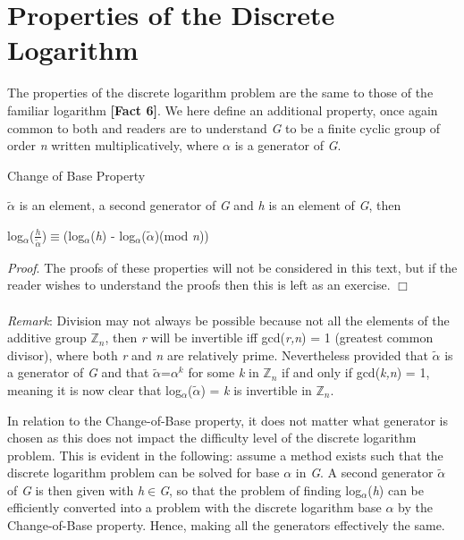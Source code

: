 \documentclass[iwp,first]{luthesis}
\begin{document}
\section{Properties of the Discrete Logarithm}

The properties of the discrete logarithm problem are the same to those of the familiar logarithm \textbf{[Fact 6]}. We here define an additional property, once again common to both and readers are to understand \textit{G} to be a finite cyclic group of order \textit{n} written multiplicatively, where \textit{$\alpha$} is a generator of \textit{G}.

\begin{mydef}
Change of Base Property
\end{mydef}

$\widetilde{\alpha}$ is an element, a second generator of \textit{G} and \textit{h} is an element of \textit{G}, then

\begin{center}
log$_\alpha$(\textit{$\frac{h}{\widetilde{\alpha}}$})$\equiv$(log$_\alpha$(\textit{h}) - log$_\alpha$($\widetilde{\alpha}$)(mod \textit{n}))
\end{center}

\textit{Proof}. The proofs of these properties will not be considered in this text, but if the reader wishes to understand the proofs then this is left as an exercise. $\Box$
\\
\\
\textit{Remark}: Division may not always be possible because not all the elements of the additive group $\mathbb{Z}_n$, then \textit{r} will be invertible iff gcd(\textit{r,n}) = 1 (greatest common divisor), where both \textit{r} and \textit{n} are relatively prime. Nevertheless provided that $\widetilde{\alpha}$ is a generator of \textit{G} and that $\widetilde{\alpha}$=$\alpha$$^k$ for some \textit{k} in $\mathbb{Z}_n$ if and only if gcd(\textit{k,n}) = 1, meaning it is now clear that  log$_\alpha$($\widetilde{\alpha}$) = \textit{k} is invertible in $\mathbb{Z}_n$.

In relation to the Change-of-Base property, it does not matter what generator is chosen as this does not impact the difficulty level of the discrete logarithm problem. This is evident in the following: assume a method exists such that the discrete logarithm problem can be solved for base \textit{$\alpha$} in \textit{G}. A second generator $\widetilde{\alpha}$ of \textit{G} is then given with \textit{h$\in$G}, so that the problem of finding log$_\alpha$(\textit{h}) can be efficiently converted into a problem with the discrete logarithm base $\alpha$ by the Change-of-Base property. Hence, making all the generators effectively the same. 
\end{document}
